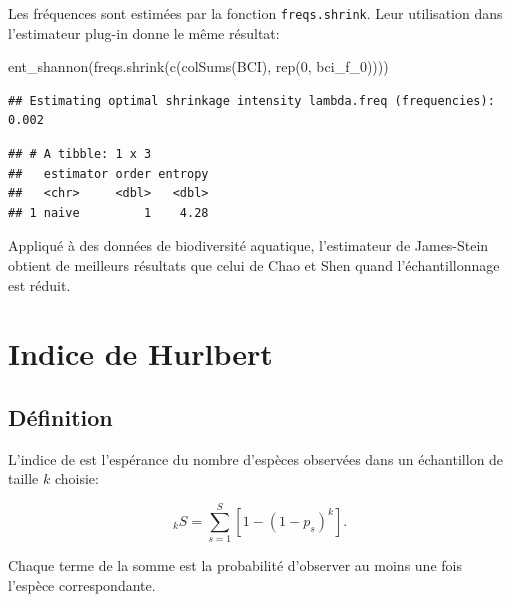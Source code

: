 \documentclass[
  11pt,
  american,
  a4paper,
  extrafontsizes,onecolumn,openright
  ]{memoir}
\newenvironment{Shaded}{\begin{snugshade}}{\end{snugshade}}
\newcommand{\DecValTok}[1]{\textcolor[rgb]{0.00,0.00,0.81}{#1}}
\newcommand{\FunctionTok}[1]{\textcolor[rgb]{0.00,0.00,0.00}{#1}}
\newcommand{\NormalTok}[1]{#1}
\begin{document}
\normalsize

Les fréquences sont estimées par la fonction \texttt{freqs.shrink}.
Leur utilisation dans l'estimateur plug-in donne le même résultat:

\scriptsize

\begin{Shaded}
\begin{Highlighting}[]
\FunctionTok{ent\_shannon}\NormalTok{(}\FunctionTok{freqs.shrink}\NormalTok{(}\FunctionTok{c}\NormalTok{(}\FunctionTok{colSums}\NormalTok{(BCI), }\FunctionTok{rep}\NormalTok{(}\DecValTok{0}\NormalTok{, bci\_f\_0))))}
\end{Highlighting}
\end{Shaded}

\begin{verbatim}
## Estimating optimal shrinkage intensity lambda.freq (frequencies): 0.002
\end{verbatim}

\begin{verbatim}
## # A tibble: 1 x 3
##   estimator order entropy
##   <chr>     <dbl>   <dbl>
## 1 naive         1    4.28
\end{verbatim}

\normalsize

Appliqué à des données de biodiversité aquatique, l'estimateur de James-Stein obtient de meilleurs résultats que celui de Chao et Shen \autocite{Liu2015} quand l'échantillonnage est réduit.

\hypertarget{sec-Hurlbert}{%
\section{Indice de Hurlbert}\label{sec-Hurlbert}}

\hypertarget{duxe9finition-2}{%
\subsection{Définition}\label{duxe9finition-2}}

L'indice de \textcite{Hurlbert1971} est l'espérance du nombre d'espèces observées dans un échantillon de taille \(k\) choisie:

\begin{equation}
  \label{eq:HurlbertSk}
  _{k}S = \sum^S_{s=1}{\left[ 1 - {\left( 1 - p_s \right)}^k \right]}.
\end{equation}

Chaque terme de la somme est la probabilité d'observer au moins une fois l'espèce correspondante.
\end{document}
